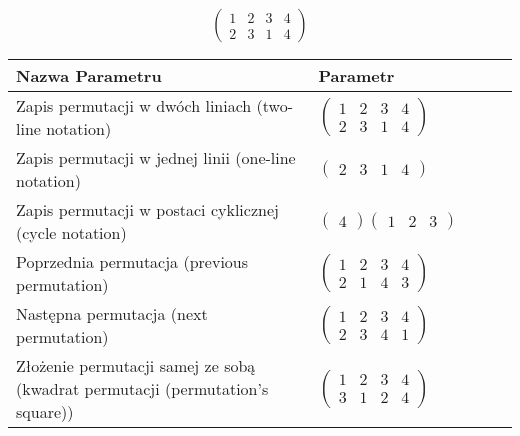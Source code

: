 \documentclass[12pt]{article}
\begin{document}
\subsection{}
\begin{center}
\[
\begin{pmatrix}
	1 & 2 & 3 & 4 \\ 
	2 & 3 & 1 & 4 
\end{pmatrix}
\]

\begin{tabular}{|m{0.6\linewidth}|m{0.4\linewidth}|}
	\hline
	Nazwa Parametru & Parametr \\
	\hline
	Zapis permutacji w dwóch liniach (two-line notation) & $\begin{pmatrix} 1 & 2 & 3 & 4 \\ 
2 & 3 & 1 & 4 \end{pmatrix}$ \\ 
	\hline
	Zapis permutacji w jednej linii (one-line notation) & $\begin{pmatrix} 2 & 3 & 1 & 4 \end{pmatrix}$ \\ 
	\hline
	Zapis permutacji w postaci cyklicznej (cycle notation) & $\begin{pmatrix} 4 \end{pmatrix} \begin{pmatrix} 1 & 2 & 3 \end{pmatrix} $ \\ 
	\hline
	Poprzednia permutacja (previous permutation) & $\begin{pmatrix} 1 & 2 & 3 & 4 \\ 
2 & 1 & 4 & 3 \end{pmatrix}$ \\ 
	\hline
	Następna permutacja (next permutation) & $\begin{pmatrix} 1 & 2 & 3 & 4 \\ 
2 & 3 & 4 & 1 \end{pmatrix}$ \\ 
	\hline
	Złożenie permutacji samej ze sobą (kwadrat permutacji (permutation's square)) & $\begin{pmatrix} 1 & 2 & 3 & 4 \\ 
3 & 1 & 2 & 4 \end{pmatrix}$ \\ 
	\hline
\end{tabular}
\end{center}
\end{document}
